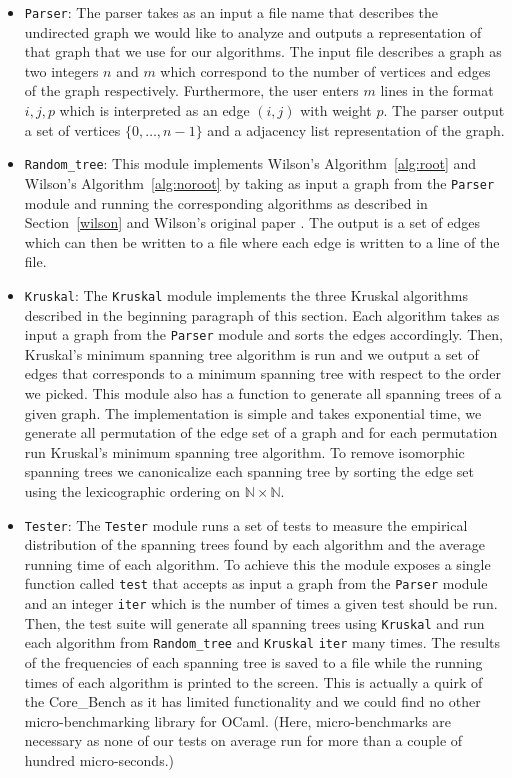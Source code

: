 \documentclass[11pt]{article}
\begin{document}
\begin{itemize}
\item \texttt{Parser}: The parser takes as an input a file name that describes the undirected graph we would like to analyze and outputs a representation of that graph that we use for our algorithms. The input file describes a graph as two integers $n$ and $m$ which correspond to the number of vertices and edges of the graph respectively. Furthermore, the user enters $m$ lines in the format $i,j,p$ which is interpreted as an edge $(i,j)$ with weight $p$. The parser output a set of vertices $\{0,\dots,n-1\}$ and a adjacency list representation of the graph.
\item \texttt{Random\_tree}: This module implements Wilson's Algorithm~\ref{alg:root} and Wilson's Algorithm~\ref{alg:noroot} by taking as input a graph from the \texttt{Parser} module and running the corresponding algorithms as described in Section~\ref{wilson} and Wilson's original paper \cite{wilson}. The output is a set of edges which can then be written to a file where each edge is written to a line of the file.
\item \texttt{Kruskal}: The \texttt{Kruskal} module implements the three Kruskal algorithms described in the beginning paragraph of this section. Each algorithm takes as input a graph from the \texttt{Parser} module and sorts the edges accordingly. Then, Kruskal's minimum spanning tree algorithm is run and we output a set of edges that corresponds to a minimum spanning tree with respect to the order we picked. This module also has a function to generate all spanning trees of a given graph. The implementation is simple and takes exponential time, we generate all permutation of the edge set of a graph and for each permutation run Kruskal's minimum spanning tree algorithm. To remove isomorphic spanning trees we canonicalize each spanning tree by sorting the edge set using the lexicographic ordering on $\mathbb{N}\times\mathbb{N}$.
\item \texttt{Tester}: The \texttt{Tester} module runs a set of tests to measure the empirical distribution of the spanning trees found by each algorithm and the average running time of each algorithm. To achieve this the module exposes a single function called \texttt{test} that accepts as input a graph from the \texttt{Parser} module and an integer \texttt{iter} which is the number of times a given test should be run. Then, the test suite will generate all spanning trees using \texttt{Kruskal} and run each algorithm from \texttt{Random\_tree} and \texttt{Kruskal} \texttt{iter} many times. The results of the frequencies of each spanning tree is saved to a file while the running times of each algorithm is printed to the screen. This is actually a quirk of the Core\_Bench as it has limited functionality and we could find no other micro-benchmarking library for OCaml. (Here, micro-benchmarks are necessary as none of our tests on average run for more than a couple of hundred micro-seconds.)
\end{itemize}
\end{document}
